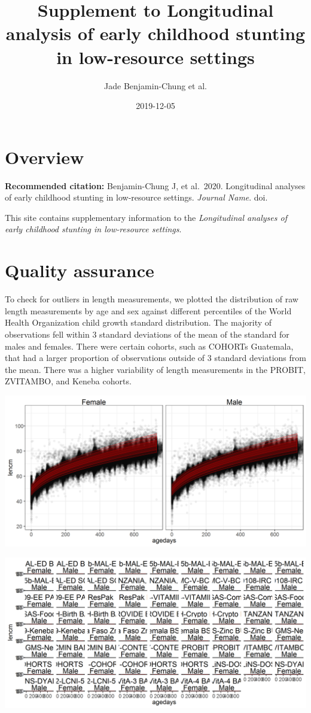 \documentclass[9pt,]{book}
\title{Supplement to Longitudinal analysis of early childhood stunting in low-resource settings}
\author{Jade Benjamin-Chung et al.}
\date{2019-12-05}
\begin{document}
\maketitle

{
\setcounter{tocdepth}{1}
\tableofcontents
}
\hypertarget{overview}{%
\chapter{Overview}\label{overview}}

\textbf{Recommended citation:} Benjamin-Chung J, et al.~2020. Longitudinal analyses of early childhood stunting in low-resource settings. \emph{Journal Name}. doi.

This site contains supplementary information to the \emph{Longitudinal analyses of early childhood stunting in low-resource settings}.

\hypertarget{QA}{%
\chapter{Quality assurance}\label{QA}}

\raggedright

To check for outliers in length measurements, we plotted the distribution of raw length measurements by age and sex against different percentiles of the World Health Organization child growth standard distribution. The majority of observations fell within 3 standard deviations of the mean of the standard for males and females. There were certain cohorts, such as COHORTs Guatemala, that had a larger proportion of observations outside of 3 standard deviations from the mean. There was a higher variability of length measurements in the PROBIT, ZVITAMBO, and Keneba cohorts.

\includegraphics[width=33.33in]{figure-copies/laz_QA}

\includegraphics[width=104.17in]{figure-copies/laz_QA_cohort}
\end{document}
